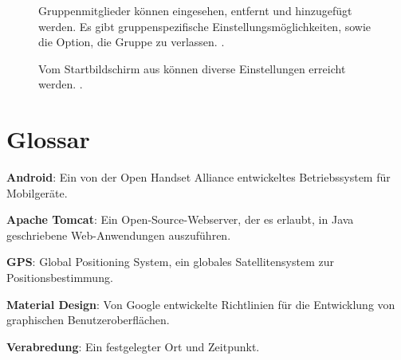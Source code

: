 \documentclass[parskip=full,11pt]{scrartcl}
\begin{document}
\begin{figure}[hb]
		\caption{\label{fig:map}
			Gruppenmitglieder können eingesehen, entfernt und hinzugefügt werden.
			Es gibt gruppenspezifische Einstellungsmöglichkeiten, sowie die Option,
			die Gruppe zu verlassen.
			.
		}
\end{figure}

\begin{figure}[hb]
		\caption{\label{fig:map}
			Vom Startbildschirm aus können diverse Einstellungen erreicht werden.
			.
		}
\end{figure}

\section{Glossar}

\textbf{Android}:
Ein von der Open Handset Alliance entwickeltes Betriebssystem für Mobilgeräte.

\textbf{Apache Tomcat}:
Ein Open-Source-Webserver, der es erlaubt, in Java geschriebene Web-Anwendungen
auszuführen.

\textbf{GPS}:
Global Positioning System, ein globales Satellitensystem zur
Positionsbestimmung.

\textbf{Material Design}:
Von Google entwickelte Richtlinien für die Entwicklung von graphischen
Benutzeroberflächen.

\textbf{Verabredung}:
Ein festgelegter Ort und Zeitpunkt.
\end{document}
